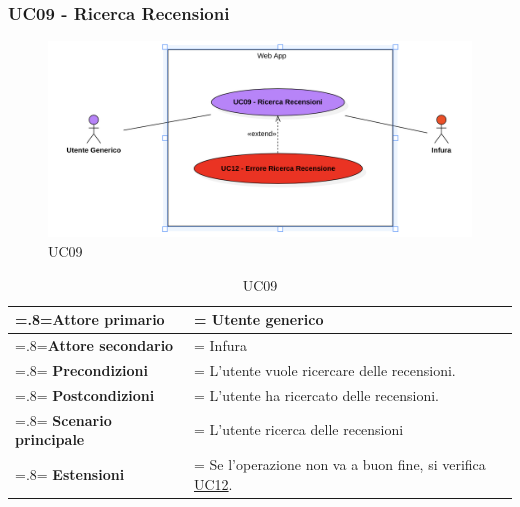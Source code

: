         \subsubsection{UC09 - Ricerca Recensioni}
        \label{UC09}

            \begin{figure}[H]
                \centering
                \includegraphics[scale=0.6]{src/img/UC09.png}
                \caption{UC09}
            \end{figure}

            \begin{table}[H]
                \centering
                \renewcommand{\arraystretch}{1.8}
                \renewcommand\tabularxcolumn[1]{m{#1}}
                \begin{tabularx}{0.9\textwidth} {
                    >{\hsize=.8\hsize\linewidth=\hsize}X
                    >{\hsize=1.2\hsize\linewidth=\hsize}X}
                    \hline
                    \textbf{Attore primario} & Utente generico \\
                    \hline
                    \textbf{Attore secondario} & Infura \\
                    \hline
                    \textbf{Precondizioni} & L'utente vuole ricercare delle recensioni. \\
                    \hline
                    \textbf{Postcondizioni} & L'utente ha ricercato delle recensioni. \\
                    \hline
                    \textbf{Scenario principale} & L'utente ricerca delle recensioni \\
                    \hline
                    \textbf{Estensioni} & Se l'operazione non va a buon fine, si verifica \hyperref[UC12]{UC12}. \\
                    \hline
                \end{tabularx}
                \caption{UC09}
            \end{table}


